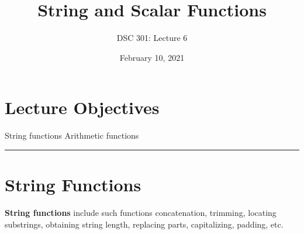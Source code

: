 \documentclass{article}
\newtheorem{definition}{Definition}
\begin{document}
\title{String and Scalar Functions}
\author{DSC 301: Lecture 6}
\date{February 10, 2021} %
\maketitle





\begin{outline}[enumerate]

\end{outline}
\begin{outline}
        
\end{outline}




\section*{Lecture Objectives}
\begin{outline}
        \1 String functions
        \1 Arithmetic functions
\end{outline}

\hspace{-0.5cm}\rule[-0.101in]{\textwidth}{0.0025in}
% 
% 









\section*{String Functions}
 
\textbf{String functions} include such functions concatenation, trimming, locating substrings, obtaining string length, replacing parts, capitalizing, padding, etc.  
\end{document}
